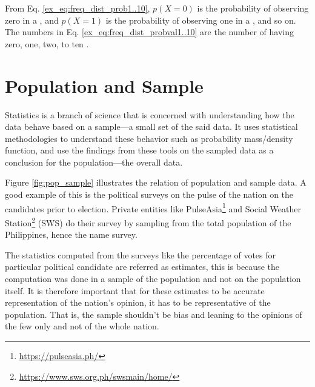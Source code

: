 \begin{exmp}
From Eq. \ref{ex_eq:freq_dist_prob1..10}, $ p(X=0)$ is the probability of observing zero   in a  , and $ p(X=1)$ is the probability of observing one   in a  , and so on. The numbers in Eq. \ref{ex_eq:freq_dist_probval1..10} are the number of   having zero, one, two, to ten  .

\end{exmp}
\section{Population and Sample}
Statistics is a branch of science that is concerned with understanding how the data behave based on a sample---a small set of the said data. It uses statistical methodologies to understand these behavior such as probability mass/density function, and use the findings from these tools on the sampled data as a conclusion for the population---the overall data.

Figure \ref{fig:pop_sample} illustrates the relation of population and sample data. A good example of this is the political surveys on the pulse of the nation on the candidates prior to election. Private entities like PulseAsia\footnote{\url{https://pulseasia.ph/}} and Social Weather Station\footnote{\url{https://www.sws.org.ph/swsmain/home/}} (SWS) do their survey by  sampling from the total population of the Philippines, hence the name survey.

The statistics computed from the surveys like the percentage of votes for particular political candidate are referred as estimates, this is because the computation was done in a sample of the population and not on the population itself. It is therefore important that for these estimates to be accurate representation of the nation's opinion, it has to be representative of the population. That is, the sample shouldn't be bias and leaning to the opinions of the few only and not of the whole nation.

